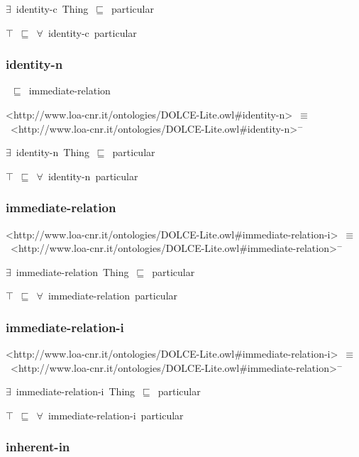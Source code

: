 \documentclass{article}
\begin{document}
\ensuremath{\exists}~identity-c~Thing~\ensuremath{\sqsubseteq}~particular

\ensuremath{\top}~\ensuremath{\sqsubseteq}~\ensuremath{\forall}~identity-c~particular

\subsubsection*{identity-n}

~\ensuremath{\sqsubseteq}~immediate-relation

<http://www.loa-cnr.it/ontologies/DOLCE-Lite.owl#identity-n>~\ensuremath{\equiv}~<http://www.loa-cnr.it/ontologies/DOLCE-Lite.owl#identity-n>\ensuremath{^-}



\ensuremath{\exists}~identity-n~Thing~\ensuremath{\sqsubseteq}~particular

\ensuremath{\top}~\ensuremath{\sqsubseteq}~\ensuremath{\forall}~identity-n~particular

\subsubsection*{immediate-relation}

<http://www.loa-cnr.it/ontologies/DOLCE-Lite.owl#immediate-relation-i>~\ensuremath{\equiv}~<http://www.loa-cnr.it/ontologies/DOLCE-Lite.owl#immediate-relation>\ensuremath{^-}

\ensuremath{\exists}~immediate-relation~Thing~\ensuremath{\sqsubseteq}~particular

\ensuremath{\top}~\ensuremath{\sqsubseteq}~\ensuremath{\forall}~immediate-relation~particular

\subsubsection*{immediate-relation-i}

<http://www.loa-cnr.it/ontologies/DOLCE-Lite.owl#immediate-relation-i>~\ensuremath{\equiv}~<http://www.loa-cnr.it/ontologies/DOLCE-Lite.owl#immediate-relation>\ensuremath{^-}

\ensuremath{\exists}~immediate-relation-i~Thing~\ensuremath{\sqsubseteq}~particular

\ensuremath{\top}~\ensuremath{\sqsubseteq}~\ensuremath{\forall}~immediate-relation-i~particular

\subsubsection*{inherent-in}
\end{document}
